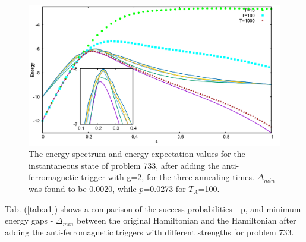 \documentclass[../main.tex]{subfiles}
\begin{document}
\begin{figure}[H]
\centering 
\includegraphics[scale=0.24]{733_s12_A_g2.png}
\caption{The energy spectrum and energy expectation values for the instantaneous state of problem 733, after adding the anti-ferromagnetic trigger with g=2, for the three annealing times. $\Delta_{min}$ was found to be 0.0020, while $p$=0.0273 for $T_A$=100. }
\label{fig:a3}
\end{figure}
Tab. (\ref{tab:a1}) shows a comparison of the success probabilities - p, and minimum energy gaps - $\Delta_{min}$ between the original Hamiltonian and the Hamiltonian after adding the anti-ferromagnetic triggers with different strengths for problem 733.
\end{document}
